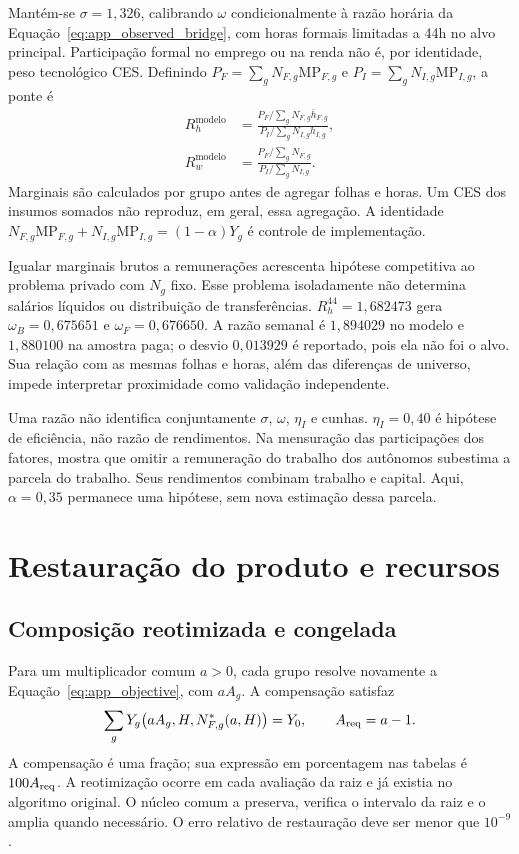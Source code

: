 Mantém-se $\sigma=1{,}326$, calibrando $\omega$ condicionalmente à razão horária da Equação~\eqref{eq:app_observed_bridge}, com horas formais limitadas a 44h no alvo principal. Participação formal no emprego ou na renda não é, por identidade, peso tecnológico CES. Definindo $P_F=\sum_gN_{F,g}\mathrm{MP}_{F,g}$ e $P_I=\sum_gN_{I,g}\mathrm{MP}_{I,g}$, a ponte é
\begin{align}
R_h^{\mathrm{modelo}}&=\frac{P_F/\sum_gN_{F,g}\bar h_{F,g}}{P_I/\sum_gN_{I,g}h_{I,g}},\label{eq:app_model_bridge}\\
R_w^{\mathrm{modelo}}&=\frac{P_F/\sum_gN_{F,g}}{P_I/\sum_gN_{I,g}}.
\end{align}
Marginais são calculados por grupo antes de agregar folhas e horas. Um CES dos insumos somados não reproduz, em geral, essa agregação. A identidade $N_{F,g}\mathrm{MP}_{F,g}+N_{I,g}\mathrm{MP}_{I,g}=(1-\alpha)Y_g$ é controle de implementação.

Igualar marginais brutos a remunerações acrescenta hipótese competitiva ao problema privado com $N_g$ fixo. Esse problema isoladamente não determina salários líquidos ou distribuição de transferências. $R_h^{44}=1{,}682473$ gera $\omega_B=0{,}675651$ e $\omega_F=0{,}676650$. A razão semanal é $1{,}894029$ no modelo e $1{,}880100$ na amostra paga; o desvio $0{,}013929$ é reportado, pois ela não foi o alvo. Sua relação com as mesmas folhas e horas, além das diferenças de universo, impede interpretar proximidade como validação independente.

Uma razão não identifica conjuntamente $\sigma$, $\omega$, $\eta_I$ e cunhas. $\eta_I=0{,}40$ é hipótese de eficiência, não razão de rendimentos. Na mensuração das participações dos fatores, \citet{Gollin2002} mostra que omitir a remuneração do trabalho dos autônomos subestima a parcela do trabalho. Seus rendimentos combinam trabalho e capital. Aqui, $\alpha=0{,}35$ permanece uma hipótese, sem nova estimação dessa parcela.

\FloatBarrier
\section{Restauração do produto e recursos}\label{app:areq_resources}
\subsection{Composição reotimizada e congelada}
Para um multiplicador comum $a>0$, cada grupo resolve novamente a Equação~\eqref{eq:app_objective}, com $aA_g$. A compensação satisfaz
\begin{equation}\label{eq:app_areq}
\sum_gY_g\big(aA_g,H,N_{F,g}^*(a,H)\big)=Y_0,\qquad A_{\mathrm{req}}=a-1.
\end{equation}
A compensação é uma fração; sua expressão em porcentagem nas tabelas é $100A_{\mathrm{req}}$. A reotimização ocorre em cada avaliação da raiz e já existia no algoritmo original. O núcleo comum a preserva, verifica o intervalo da raiz e o amplia quando necessário. O erro relativo de restauração deve ser menor que $10^{-9}$.

